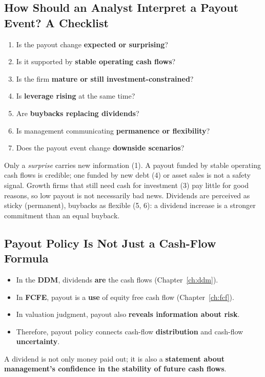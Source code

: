 \subsection{How Should an Analyst Interpret a Payout Event? A Checklist}
\begin{enumerate}
  \item Is the payout change \textbf{expected or surprising}?
  \item Is it supported by \textbf{stable operating cash flows}?
  \item Is the firm \textbf{mature or still investment-constrained}?
  \item Is \textbf{leverage rising} at the same time?
  \item Are \textbf{buybacks replacing dividends}?
  \item Is management communicating \textbf{permanence or flexibility}?
  \item Does the payout event change \textbf{downside scenarios}?
\end{enumerate}
\begin{addbox}
Only a \emph{surprise} carries new information (1). A payout funded by stable operating cash flows is credible; one funded by new debt (4) or asset sales is not a safety signal. Growth firms that still need cash for investment (3) pay little for good reasons, so low payout is not necessarily bad news. Dividends are perceived as sticky (permanent), buybacks as flexible (5, 6): a dividend increase is a stronger commitment than an equal buyback.
\end{addbox}

\subsection{Payout Policy Is Not Just a Cash-Flow Formula}
\begin{itemize}
  \item In the \textbf{DDM}, dividends \textbf{are} the cash flows (Chapter~\ref{ch:ddm}).
  \item In \textbf{FCFE}, payout is a \textbf{use} of equity free cash flow (Chapter~\ref{ch:fcf}).
  \item In valuation judgment, payout also \textbf{reveals information about risk}.
  \item Therefore, payout policy connects cash-flow \textbf{distribution} and cash-flow \textbf{uncertainty}.
\end{itemize}
\begin{keybox}
A dividend is not only money paid out; it is also a \textbf{statement about management's confidence in the stability of future cash flows}.
\end{keybox}

